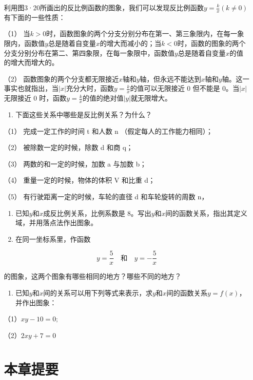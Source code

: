 利用图3·20所画出的反比例函数的图象，我们可以发现反比例函数\(y = \frac{k}{x} (k \neq 0)\)有下面的一些性质：

（1）
当\(k > 0\)时，函数图象的两个分支分别分布在第一、第三象限内，在每一象限内，函数值\(y\)总是随着自变量\(x\)的增大而减小的；当\(k < 0\)时，函数的图象的两个分支分别分布在第二、第四象限，在每一象限中，函数值\(y\)总是随着自变量\(x\)的值的增大而增大的。

（2）
函数图象的两个分支都无限接近\(x\)轴和\(y\)轴，但永远不能达到\(x\)轴和\(y\)轴。这一事实也就指出，当\(|x|\)充分大时，函数\(y = \frac{k}{x}\)的值可以无限接近
0 但不能是 0。当\(|x|\)无限接近 0
时，函数\(y = \frac{k}{x}\)的值的绝对值\(|y|\)就无限增大。

\begin{enumerate}
\item
  下面这些关系中哪些是反比例关系？为什么？
\end{enumerate}

（1） 完成一定工作的时间 t 和人数 n （假定每人的工作能力相同）；

（2） 被除数一定的时候，除数 d 和商 q；

（3） 两数的和一定的时候，加数 a 与加数 b；

（4） 重量一定的时候，物体的体积 V 和比重 d；

（5） 有行驶距离一定的时候，车轮的直径 d 和车轮旋转的周数 n，

\begin{enumerate}[start=2]
\item
  已知\(y\)和\(x\)成反比例关系，比例系数是
  8。写出\(y\)和\(x\)间的函数关系，指出其定义域，并用落点法作出图象。
\item
  在同一坐标系里，作函数
\end{enumerate}

\[
y = \frac{5}{x} \quad \text{和} \quad y = - \frac{5}{x}
\]

的图象，这两个图象有哪些相同的地方？哪些不同的地方？

\begin{enumerate}[start=4]
\item
  已知\(y\)和\(x\)间的关系可以用下列等式来表示，求\(y\)和\(x\)间的函数关系\(y = f(x)\)，并作出图象：
\end{enumerate}

（1）\(xy - 10 = 0;\)

（2）\(2xy + 7 = 0\)

\section{本章提要}

